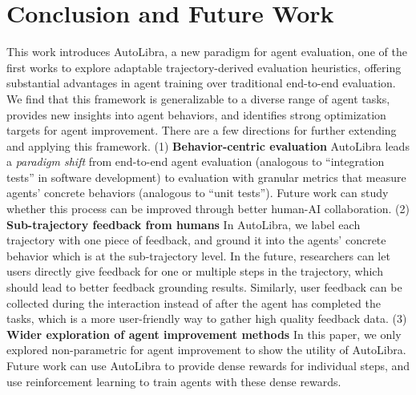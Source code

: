 \section{Conclusion and Future Work}
This work introduces AutoLibra, a new paradigm for agent evaluation, one of
the first works to explore adaptable trajectory-derived evaluation heuristics,
offering substantial advantages in agent training over traditional end-to-end
evaluation. We find that this framework is generalizable to a diverse range of agent
tasks, provides new insights into agent behaviors, and identifies strong optimization
targets for agent improvement. There are a few directions for further extending
and applying this framework.
(1) \textbf{Behavior-centric evaluation} AutoLibra leads a \emph{paradigm shift}
from end-to-end agent evaluation (analogous to ``integration tests'' in software
development) to evaluation with granular metrics that measure agents' concrete behaviors
(analogous to ``unit tests''). Future work can study whether this process can be
improved through better human-AI collaboration.
(2) \textbf{Sub-trajectory feedback from humans} In AutoLibra, we label each
trajectory with one piece of feedback, and ground it into the agents' concrete
behavior which is at the sub-trajectory level. In the future, researchers can
let users directly give feedback for one or multiple steps in the trajectory, which
should lead to better feedback grounding results. Similarly, user feedback can be
collected during the interaction instead of after the agent has completed the tasks,
which is a more user-friendly way to gather high quality feedback data.
(3) \textbf{Wider exploration of agent improvement methods} In this paper, we only
explored non-parametric for agent improvement to show the utility of AutoLibra. Future work can use AutoLibra to provide dense rewards for individual
steps, and use reinforcement learning to train agents with these dense rewards.